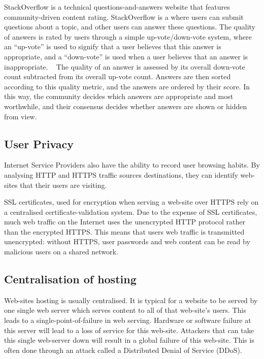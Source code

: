 StackOverflow is a technical questions-and-answers website that features
community-driven content rating. StackOverflow is a where users can submit
questions about a topic, and other users can answer these questions. The quality
of answers is rated by users through a simple up-vote/down-vote system, where an
“up-vote” is used to signify that a user believes that this answer is appropriate,
and a “down-vote” is used when a user believes that an answer is inappropriate. ~\cite{stackoverflow}
The quality of an answer is assessed by its overall down-vote count subtracted
from its overall up-vote count. Answers are then sorted according to this
quality metric, and the answers are ordered by their score. In this way, the
community decides which answers are appropriate and most worthwhile, and their
consensus decides whether answers are shown or hidden from view.

\subsection{User Privacy}

Internet Service Providers also have the ability to record user browsing habits.
By analysing HTTP and HTTPS traffic sources destinations, they can identify web-sites
that their users are visiting.

SSL certificates, used for encryption when serving a web-site over HTTPS rely on a
centralised certificate-validation system. Due to the expense of SSL certificates,
much web traffic on the Internet uses the unencrypted HTTP protocol rather than the
encrypted HTTPS. This means that users web traffic is transmitted unencrypted: without
HTTPS, user passwords and web content can be read by malicious users on a shared network.

\subsection{Centralisation of hosting}

Web-sites hosting is usually centralised. It is typical for a website to be served by
one single web server which serves content to all of that web-site’s users. This leads
to a single-point-of-failure in web serving. Hardware or software failure at this server
will lead to a loss of service for this web-site. Attackers that can take this single web-server
down will result in a global failure of this web-site. This is often done through an attack
called a Distributed Denial of Service (DDoS).

